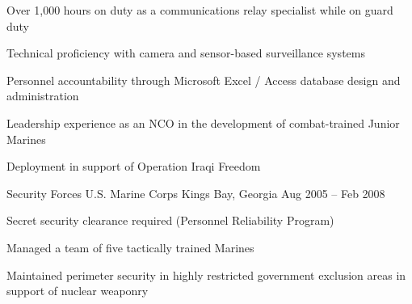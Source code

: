 \begin{cventries}
{\begin{cvitems}
		\item {Over 1,000 hours on duty as a communications relay specialist while on guard duty}
		\item {Technical proficiency with camera and sensor-based surveillance systems}
		\item {Personnel accountability through Microsoft Excel / Access database design and administration}
		\item {Leadership experience as an NCO in the development of combat-trained Junior Marines}
		\item {Deployment in support of Operation Iraqi Freedom}
		\end{cvitems}}
	\cventry
	{Security Forces}
	{U.S. Marine Corps}
	{King\textquotesingle{}s Bay, Georgia}
	{Aug 2005 – Feb 2008}
	{\begin{cvitems}
		\item {Secret security clearance required (Personnel Reliability Program)}
		\item {Managed a team of five tactically trained Marines}
		\item {Maintained perimeter security in highly restricted government exclusion areas in support of nuclear weaponry}
		\end{cvitems}}
\end{cventries}